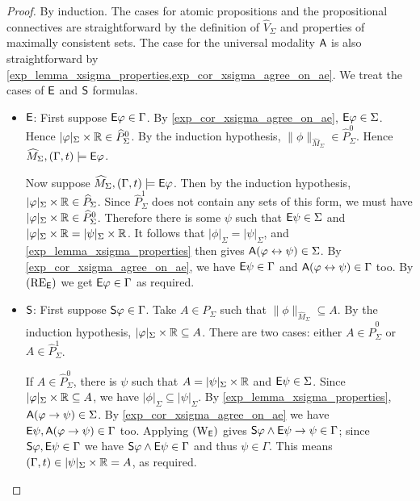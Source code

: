 \begin{proof}
    By induction. The cases for atomic propositions and
    the propositional connectives are straightforward by the definition of
    $\widehat{V}_\Sigma$ and properties of
    maximally consistent sets. The case for the universal modality $\A$ is also
    straightforward by \cref{exp_lemma_xsigma_properties,exp_cor_xsigma_agree_on_ae}.
    We treat the cases of $\E$ and $\S$
    formulas.

    \begin{itemize}
        \item $\E$: First suppose $\E\phi \in \Gamma$. By
    \cref{exp_cor_xsigma_agree_on_ae}, $\E\phi \in \Sigma$. Hence $|\phi|_\Sigma
    \times \R \in \widehat{P}_\Sigma^0$. By the induction hypothesis,
    $\|\phi\|_{\widehat{M}_\Sigma} \in \widehat{P}_\Sigma^0$. Hence
    $\widehat{M}_\Sigma, (\Gamma, t) \models \E\phi$.

    Now suppose $\widehat{M}_\Sigma, (\Gamma, t) \models \E\phi$.  Then by the
    induction hypothesis, $|\phi|_\Sigma \times \R \in \widehat{P}_\Sigma$.
    Since $\widehat{P}_\Sigma^1$ does not contain any sets of this form, we
    must have $|\phi|_\Sigma \times \R \in \widehat{P}_\Sigma^0$. Therefore
    there is some $\psi$ such that $\E\psi \in \Sigma$ and $|\phi|_\Sigma
    \times \R = |\psi|_\Sigma \times \R$.  It follows that $|\phi|_\Sigma =
    |\psi|_\Sigma$, and \cref{exp_lemma_xsigma_properties} then gives $\A(\phi
    \liff \psi) \in \Sigma$. By \cref{exp_cor_xsigma_agree_on_ae}, we have $\E\psi
    \in \Gamma$ and $\A(\phi \liff \psi) \in \Gamma$ too. By $\reE$ we get
    $\E\phi \in \Gamma$ as required.

    \item $\S$: First suppose $\S\phi \in \Gamma$. Take $A \in \widehat{P}_\Sigma$
    such that $\|\phi\|_{\widehat{M}_\Sigma} \subseteq A$. By the induction
    hypothesis, $|\phi|_\Sigma \times \R \subseteq A$. There are two cases:
    either $A \in \widehat{P}_\Sigma^0$ or $A \in \widehat{P}_\Sigma^1$.

    If $A \in \widehat{P}_\Sigma^0$, there is $\psi$ such that $A =
    |\psi|_\Sigma \times \R$ and $\E\psi \in \Sigma$.  Since $|\phi|_\Sigma
    \times \R \subseteq A$, we have $|\phi|_\Sigma \subseteq |\psi|_\Sigma$.
    By \cref{exp_lemma_xsigma_properties}, $\A(\phi \limplies \psi) \in \Sigma$. By
    \cref{exp_cor_xsigma_agree_on_ae} we have $\E\psi, \A(\phi \limplies \psi) \in
    \Gamma$ too. Applying $\weakeningE$ gives $\S\phi \land \E\psi \limplies
    \psi \in \Gamma$; since $\S\phi, \E\psi \in \Gamma$ we have $\S\phi \land
    \E\psi \in \Gamma$ and thus $\psi \in \Gamma$. This means $(\Gamma, t) \in
    |\psi|_\Sigma \times \R = A$, as required.


\end{itemize}
\end{proof}
